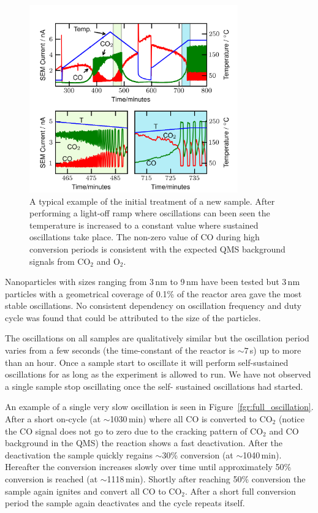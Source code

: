 \documentclass[8.5pt,twoside,twocolumn]{article}
\begin{document}
\begin{figure}[h]
\centering
  \includegraphics[width=9cm]{initial_treatment.png}
  \caption{A typical example of the initial treatment of a new sample. After
 performing a light-off ramp where oscillations can been seen the temperature
 is increased to a constant value where sustained oscillations take place. The
 non-zero value of CO during high conversion periods is consistent with the
 expected QMS background signals from CO$_2$ and O$_2$.}
  \label{fgr:initial_treatment}
\end{figure}

Nanoparticles with sizes ranging from 3\,nm to 9\,nm have been tested but 3\,nm
particles with a geometrical coverage of 0.1\% of the reactor area gave the
most stable oscillations. No consistent dependency on oscillation frequency and
duty cycle was found that could be attributed to the size of the particles.

The oscillations on all samples are qualitatively similar but the oscillation
period varies from a few seconds (the time-constant of the reactor is
$\sim7\,$s) up to more than an hour. Once a sample start to oscillate it will
perform self-sustained oscillations for as long as the experiment is allowed to
run. We have not observed a single sample stop oscillating once the self-
sustained oscillations had started.

An example of a single very slow oscillation is seen in
Figure~\ref{fgr:full_oscillation}. After a short on-cycle (at $\sim$1030\,min)
where all CO is converted to CO$_2$ (notice the CO signal does not go to zero
due to the cracking pattern of CO$_2$ and CO background in the QMS) the
reaction shows a fast deactivation. After the deactivation the sample quickly
regains $\sim$30\% conversion (at $\sim$1040\,min). Hereafter the conversion
increases slowly over time until approximately 50\% conversion is reached (at
$\sim$1118\,min). Shortly after reaching 50\% conversion the sample again
ignites and convert all CO to CO$_2$. After a short full conversion period the
sample again deactivates and the cycle repeats itself.
\end{document}

